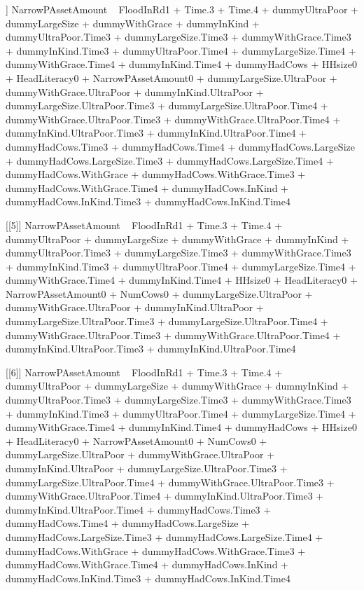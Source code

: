 \begin{Schunk}
\begin{Soutput}
[[4]]
NarrowPAssetAmount ~ FloodInRd1 + Time.3 + Time.4 + dummyUltraPoor + 
    dummyLargeSize + dummyWithGrace + dummyInKind + dummyUltraPoor.Time3 + 
    dummyLargeSize.Time3 + dummyWithGrace.Time3 + dummyInKind.Time3 + 
    dummyUltraPoor.Time4 + dummyLargeSize.Time4 + dummyWithGrace.Time4 + 
    dummyInKind.Time4 + dummyHadCows + HHsize0 + HeadLiteracy0 + 
    NarrowPAssetAmount0 + dummyLargeSize.UltraPoor + dummyWithGrace.UltraPoor + 
    dummyInKind.UltraPoor + dummyLargeSize.UltraPoor.Time3 + 
    dummyLargeSize.UltraPoor.Time4 + dummyWithGrace.UltraPoor.Time3 + 
    dummyWithGrace.UltraPoor.Time4 + dummyInKind.UltraPoor.Time3 + 
    dummyInKind.UltraPoor.Time4 + dummyHadCows.Time3 + dummyHadCows.Time4 + 
    dummyHadCows.LargeSize + dummyHadCows.LargeSize.Time3 + dummyHadCows.LargeSize.Time4 + 
    dummyHadCows.WithGrace + dummyHadCows.WithGrace.Time3 + dummyHadCows.WithGrace.Time4 + 
    dummyHadCows.InKind + dummyHadCows.InKind.Time3 + dummyHadCows.InKind.Time4

[[5]]
NarrowPAssetAmount ~ FloodInRd1 + Time.3 + Time.4 + dummyUltraPoor + 
    dummyLargeSize + dummyWithGrace + dummyInKind + dummyUltraPoor.Time3 + 
    dummyLargeSize.Time3 + dummyWithGrace.Time3 + dummyInKind.Time3 + 
    dummyUltraPoor.Time4 + dummyLargeSize.Time4 + dummyWithGrace.Time4 + 
    dummyInKind.Time4 + HHsize0 + HeadLiteracy0 + NarrowPAssetAmount0 + 
    NumCows0 + dummyLargeSize.UltraPoor + dummyWithGrace.UltraPoor + 
    dummyInKind.UltraPoor + dummyLargeSize.UltraPoor.Time3 + 
    dummyLargeSize.UltraPoor.Time4 + dummyWithGrace.UltraPoor.Time3 + 
    dummyWithGrace.UltraPoor.Time4 + dummyInKind.UltraPoor.Time3 + 
    dummyInKind.UltraPoor.Time4

[[6]]
NarrowPAssetAmount ~ FloodInRd1 + Time.3 + Time.4 + dummyUltraPoor + 
    dummyLargeSize + dummyWithGrace + dummyInKind + dummyUltraPoor.Time3 + 
    dummyLargeSize.Time3 + dummyWithGrace.Time3 + dummyInKind.Time3 + 
    dummyUltraPoor.Time4 + dummyLargeSize.Time4 + dummyWithGrace.Time4 + 
    dummyInKind.Time4 + dummyHadCows + HHsize0 + HeadLiteracy0 + 
    NarrowPAssetAmount0 + NumCows0 + dummyLargeSize.UltraPoor + 
    dummyWithGrace.UltraPoor + dummyInKind.UltraPoor + dummyLargeSize.UltraPoor.Time3 + 
    dummyLargeSize.UltraPoor.Time4 + dummyWithGrace.UltraPoor.Time3 + 
    dummyWithGrace.UltraPoor.Time4 + dummyInKind.UltraPoor.Time3 + 
    dummyInKind.UltraPoor.Time4 + dummyHadCows.Time3 + dummyHadCows.Time4 + 
    dummyHadCows.LargeSize + dummyHadCows.LargeSize.Time3 + dummyHadCows.LargeSize.Time4 + 
    dummyHadCows.WithGrace + dummyHadCows.WithGrace.Time3 + dummyHadCows.WithGrace.Time4 + 
    dummyHadCows.InKind + dummyHadCows.InKind.Time3 + dummyHadCows.InKind.Time4
\end{Soutput}
\end{Schunk}
